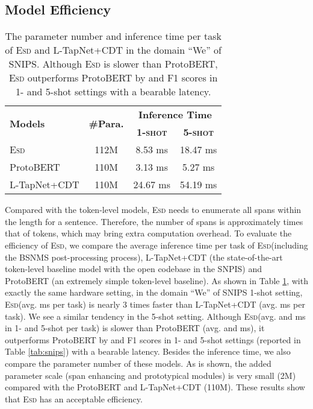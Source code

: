 \documentclass[11pt]{article}
\newcommand{\modelname}{\textsc{Esd}\xspace}
\begin{document}
\subsection{Model Efficiency}
\label{sec:me}

\begin{table}[t]
\small
\centering
\begin{tabular}{lccc}
\toprule
\multirow{2}{*}{\textbf{Models}} & \multirow{2}{*}{\textbf{\#Para.}} & \multicolumn{2}{c}{\textbf{Inference Time}} \\ 
\cmidrule(r){3-4} 
~            & ~      & \textbf{\textsc{1-shot}}    & \textbf{\textsc{5-shot}}        \\    
\midrule
\modelname   & 112M      & 8.53 ms   & 18.47 ms         \\
\midrule
ProtoBERT & 110M & 3.13 ms & 5.27 ms \\
L-TapNet+CDT & 110M      & 24.67 ms   & 54.19 ms         \\ 
\bottomrule
\end{tabular}
\caption{The parameter number and inference time per task of \modelname and L-TapNet+CDT in the domain ``We'' of SNIPS. Although \modelname is slower than ProtoBERT,
\modelname outperforms ProtoBERT by  and  F1 scores in 1- and 5-shot settings with a bearable latency.}
\label{tab:comp}
\end{table}

Compared with the token-level models, \modelname needs to enumerate all spans within the length  for a sentence.
Therefore, the number of spans is approximately  times that of tokens, which may bring extra computation overhead.
To evaluate the efficiency of \modelname, we compare the average inference time per task of \modelname (including the BSNMS post-processing process), L-TapNet+CDT (the state-of-the-art token-level baseline model with the open codebase in the SNPIS) and ProtoBERT (an extremely simple token-level baseline).
As shown in Table \ref{tab:comp}, with exactly the same hardware setting,
in the domain ``We'' of SNIPS 1-shot setting, \modelname (avg.  ms per task) is nearly 3 times faster than L-TapNet+CDT (avg.  ms per task). We see a similar tendency in the 5-shot setting.
Although \modelname (avg.   and  ms in 1- and 5-shot per task) is slower than ProtoBERT (avg.  and  ms),
it outperforms ProtoBERT by  and  F1 scores in 1- and 5-shot settings (reported in Table \ref{tab:snips}) with a bearable latency.
Besides the inference time, we also compare the parameter number of these models.
As is shown, the added parameter scale (span enhancing and prototypical modules) is very small (2M) compared with the ProtoBERT and L-TapNet+CDT (110M). 
These results show that \modelname has an acceptable efficiency.
\end{document}
